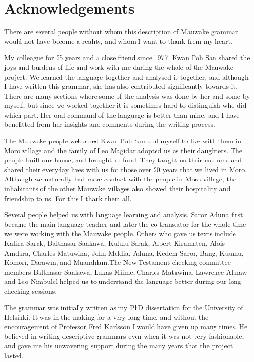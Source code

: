

\section*{Acknowledgements}

There are several people without whom this description of Mauwake grammar would not have become a reality, and whom I want to thank from my heart.

My colleague for 25 years and a close friend since 1977, Kwan Poh San shared the joys and burdens of life and work with me during the whole of the Mauwake project. We learned the language together and analysed it together, and although I have written this grammar, she has also contributed significantly towards it.  There are many sections where some of the analysis was done by her and some by myself, but since we worked together it is sometimes hard to distinguish who did which part. Her oral command of the language is better than mine, and I have benefitted from her insights and comments during the writing process.  

The Mauwake people welcomed Kwan Poh San and myself to live with them in Moro village and the family of Leo Magidar adopted us as their daughters. The people built our house, and brought us food. They taught us their customs and shared their everyday lives with us for those over 20 years that we lived in Moro. Although we naturally had more contact with the people in Moro village, the inhabitants of the other Mauwake villages also showed their hospitality and friendship to us. For this I thank them all. 

Several people helped us with language learning and analysis. Saror Aduna first became the main language teacher and later the co-translator for the whole time we were working with the Mauwake people. Others who gave us texts include Kalina Sarak, Balthasar Saakawa, Kululu Sarak, Albert Kiramaten, Alois Amdara, Charles Matuwina, John Meldia, Aduna, Kedem Saror, Bang, Kuumu, Komori, Darawin, and Muandilam.The New Testament checking committee members Balthasar Saakawa, Lukas Miime, Charles Matuwina, Lawrence Alinaw and Leo Nimbulel helped us to understand the language better during our long checking sessions.

The grammar was initially written as my PhD dissertation for the University of Helsinki. It was in the making for a very long time, and without the encouragement of Professor Fred Karlsson I would have given up many times. He believed in writing descriptive grammars even when it was not very fashionable, and gave me his unwavering support during the many years that the project lasted.

